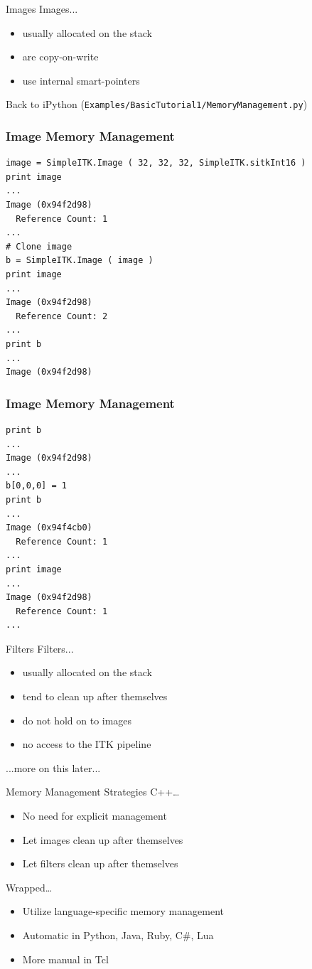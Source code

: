 \begin{frame}{Images}
Images...
\begin{itemize}
  \item usually allocated on the stack
  \item are copy-on-write
  \item use internal smart-pointers
\end{itemize}
Back to iPython (\texttt{Examples/BasicTutorial1/MemoryManagement.py})
\end{frame}

\begin{frame}[fragile]
\frametitle{Image Memory Management}
\lstpython
\begin{lstlisting}
image = SimpleITK.Image ( 32, 32, 32, SimpleITK.sitkInt16 )
print image
...
Image (0x94f2d98)
  Reference Count: 1
...
# Clone image
b = SimpleITK.Image ( image )
print image
...
Image (0x94f2d98)
  Reference Count: 2
...
print b
...
Image (0x94f2d98)
\end{lstlisting}
\end{frame}

\begin{frame}[fragile]
\frametitle{Image Memory Management}
\lstpython
\begin{lstlisting}
print b
...
Image (0x94f2d98)
...
b[0,0,0] = 1
print b
...
Image (0x94f4cb0)
  Reference Count: 1
...
print image
...
Image (0x94f2d98)
  Reference Count: 1
...
\end{lstlisting}
\end{frame}


\begin{frame}{Filters}
Filters...
\begin{itemize}
  \item usually allocated on the stack
  \item tend to clean up after themselves
  \item do not hold on to images
  \item no access to the ITK pipeline
\end{itemize}
...more on this later...
\end{frame}

\begin{frame}{Memory Management Strategies}
C++\dots
\begin{itemize}
  \item No need for explicit management
  \item Let images clean up after themselves
  \item Let filters clean up after themselves
\end{itemize}
Wrapped\dots
\begin{itemize}
  \item Utilize language-specific memory management
  \item Automatic in Python, Java, Ruby, C\#, Lua
  \item More manual in Tcl
\end{itemize}
\end{frame}

